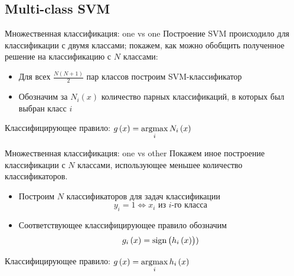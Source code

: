 \subsection{Multi-class SVM}
\begin{frame}{Множественная классификация: one vs one}
	Построение SVM происходило для классификации с двумя классами; покажем, как можно
	обобщить полученное решение на классификацию с $N$ классами:

	\begin{itemize}
		\item Для всех $\frac{N\left(N + 1\right)}{2}$ пар классов построим SVM-классификатор
		\item Обозначим за $N_i\left(x\right)$ количество парных классификаций, в которых был выбран класс $i$
	\end{itemize}

	Классифицирующее правило: $g\left(x\right)=\operatorname*{argmax}\limits_i N_i\left(x\right)$
\end{frame}

\begin{frame}{Множественная классификация: one vs other}
	Покажем иное построение классификации с $N$ классами, использующее меньшее
	количество классификаторов.

	\begin{itemize}
		\item Построим $N$ классификаторов для задач классификации 
			$$y_i=1\Leftrightarrow x_i\text{ из $i$-го класса}$$
		\item
			Соответствующее классифицирующее правило обозначим 
			$$ g_i\left(x\right) = \operatorname{sign}\left(h_i\left(x\right)\right))$$
	\end{itemize}

	Классифицирующее правило: $g\left(x\right)=\operatorname*{argmax}\limits_i h_i\left(x\right)$
\end{frame}

